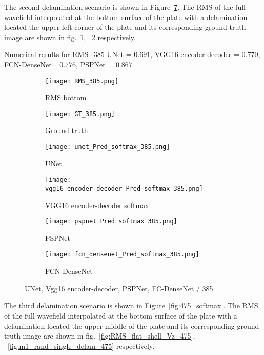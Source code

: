 The second delamination scenario is shown in Figure~\ref{fig:385_softmax}. 
The RMS of the full wavefield interpolated at the bottom surface of the plate with a delamination located the upper left corner of the plate and its corresponding ground truth image are shown in fig.~\ref{fig:RMS_flat_shell_Vz_385}, ~\ref{fig:m1_rand_single_delam_385} respectively. 

Numerical results for RMS\_385
UNet = \(0.691\), VGG16 encoder-decoder = \(0.770\), FCN-DenseNet =\(0.776\), PSPNet = \(0.867\)

	\begin{figure}[!h]
		\centering
		\begin{subfigure}[b]{0.47\textwidth}
			\centering
			\texttt{[image: RMS\_385.png]}
			\caption{RMS bottom}
			\label{fig:RMS_flat_shell_Vz_385}
		\end{subfigure}
		\hfill
		\begin{subfigure}[b]{0.47\textwidth}
			\centering
			\texttt{[image: GT\_385.png]}
			\caption{Ground truth}
			\label{fig:m1_rand_single_delam_385}
		\end{subfigure}
		\begin{subfigure}[b]{0.47\textwidth}
			\centering
			\texttt{[image: unet\_Pred\_softmax\_385.png]}
			\caption{UNet}
			\label{fig:Unet_Pred__softmax_385}
		\end{subfigure}
		\hfill
		\begin{subfigure}[b]{0.47\textwidth}
			\centering
			\texttt{[image: vgg16\_encoder\_decoder\_Pred\_softmax\_385.png]}
			\caption{VGG16 encoder-decoder softmax}			\label{fig:vgg16_pred__softmax_385}			
		\end{subfigure}
		\hfill
		\begin{subfigure}[b]{0.47\textwidth}
			\centering
			\texttt{[image: pspnet\_Pred\_softmax\_385.png]}
			\caption{PSPNet}
			\label{fig:pspnet_pred__softmax_385}
		\end{subfigure}	
		\hfill
		\begin{subfigure}[b]{0.47\textwidth}
			\centering
			\texttt{[image: fcn\_densenet\_Pred\_softmax\_385.png]}
			\caption{FCN-DenseNet}
			\label{fig:fcn_densenet_pred__softmax_385}
		\end{subfigure}	
		\caption{UNet, Vgg16 encoder-decoder, PSPNet, FC-DenseNet / 385}
		\label{fig:385_softmax}
	\end{figure}

The third delamination scenario is shown in Figure~\ref{fig:475_softmax}. 
The RMS of the full wavefield interpolated at the bottom surface of the plate with a delamination located the upper middle  of the plate and its corresponding ground truth image are shown in fig.~\ref{fig:RMS_flat_shell_Vz_475}, ~\ref{fig:m1_rand_single_delam_475} respectively. 

